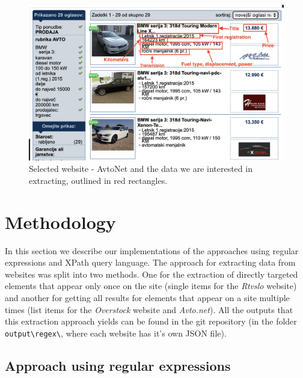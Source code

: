 \documentclass[9pt]{IEEEtran}
\begin{document}
\begin{figure}[h]
    \centering
    \includegraphics[width=1\columnwidth]{beemer.png}
    \caption{Selected website - AvtoNet and the data we are interested in extracting, outlined in red rectangles.}
    \label{fig:avtonet}
\end{figure}




\section{Methodology}
\label{section:methodology}

In this section we describe our implementations of the approaches using regular expressions and XPath query language.
The approach for extracting data from websites was split into two methods. One for the extraction of directly targeted elements that appear only once on the site (single items for the \textit{Rtvslo} website) and another for getting all results for elements that appear on a site multiple times (list items for the \textit{Overstock} website and \textit{Avto.net}). All the outputs that this extraction approach yields can be found in the git repository (in the folder \verb/output\regex\/, where each website has it's own JSON file).

\subsection{Approach using regular expressions}
\label{section:regex}
\end{document}
